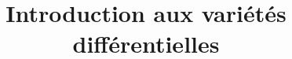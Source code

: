 \documentclass[a4paper, 12pt]{report}
\title{Introduction aux variétés différentielles}
\author{}
\begin{document}
\maketitle

\begin{abstract}

\end{abstract}

\tableofcontents


\end{document}
